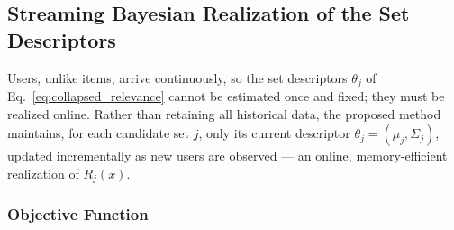 \documentclass{article}
\begin{document}
\subsection{Streaming Bayesian Realization of the Set Descriptors}
\label{subsec:user_clustering}

Users, unlike items, arrive continuously, so the set descriptors $\theta_j$ of Eq.~\eqref{eq:collapsed_relevance} cannot be estimated once and fixed; they must be realized online. Rather than retaining all historical data, the proposed method maintains, for each candidate set $j$, only its current descriptor $\theta_j = (\mu_j, \Sigma_j)$, updated incrementally as new users are observed — an online, memory-efficient realization of $R_j(x)$.

\subsubsection{Objective Function}
\end{document}
